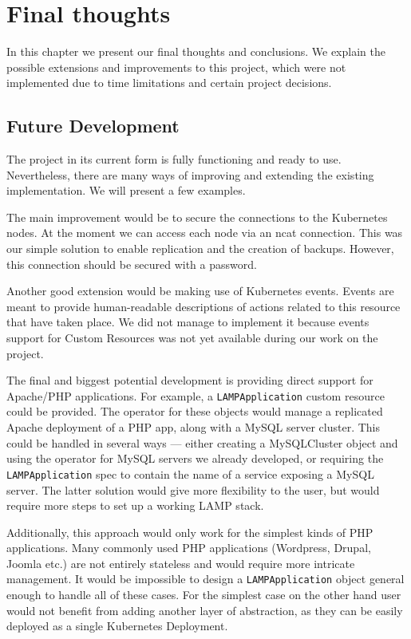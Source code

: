 \chapter{Final thoughts}
In this chapter we present our final thoughts and conclusions. We explain the possible extensions
and improvements to this project, which were not implemented due to time limitations and certain
project decisions.

\section{Future Development}
The project in its current form is fully functioning and ready to use. Nevertheless, there are many
ways of improving and extending the existing implementation. We will present a few examples.

The main improvement would be to secure the connections to the Kubernetes nodes. At the moment we
can access each node via an ncat connection. This was our simple solution to enable replication and
the creation of backups. However, this connection should be secured with a password.

Another good extension would be making use of Kubernetes events. Events are meant to provide
human-readable descriptions of actions related to this resource that have taken place. We did not
manage to implement it because events support for Custom Resources was not yet available during our
work on the project.

The final and biggest potential development is providing direct support for Apache/PHP applications.
For example, a \texttt{LAMPApplication} custom resource could be provided. The operator for these objects
would manage a replicated Apache deployment of a PHP app, along with a MySQL server cluster.
This could be handled in several ways --- either creating a MySQLCluster object and using the
operator for MySQL servers we already developed, or requiring the \texttt{LAMPApplication} spec to contain
the name of a service exposing a MySQL server. The latter solution would give more flexibility to
the user, but would require more steps to set up a working LAMP stack.

Additionally, this approach would only work for the simplest kinds of PHP applications.
Many commonly used PHP applications (Wordpress, Drupal, Joomla etc.) are not entirely stateless and
would require more intricate management. It would be impossible to design a \texttt{LAMPApplication} object
general enough to handle all of these cases. For the simplest case on the other hand user would not
benefit from adding another layer of abstraction, as they can be easily deployed as a single
Kubernetes Deployment.

